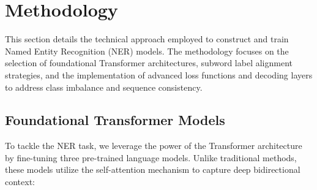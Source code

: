 \section{Methodology}

This section details the technical approach employed to construct and train Named Entity Recognition (NER) models. The methodology focuses on the selection of foundational Transformer architectures, subword label alignment strategies, and the implementation of advanced loss functions and decoding layers to address class imbalance and sequence consistency.

\subsection{Foundational Transformer Models}
To tackle the NER task, we leverage the power of the Transformer architecture by fine-tuning three pre-trained language models. Unlike traditional methods, these models utilize the self-attention mechanism to capture deep bidirectional context:

